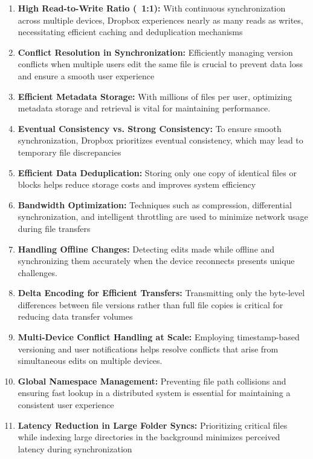 \begin{enumerate}
    \item \textbf{High Read-to-Write Ratio (~1:1):} With continuous synchronization across multiple devices, Dropbox experiences nearly as many reads as writes, necessitating efficient caching and deduplication mechanisms 
    \item \textbf{Conflict Resolution in Synchronization:} Efficiently managing version conflicts when multiple users edit the same file is crucial to prevent data loss and ensure a smooth user experience 
    \item \textbf{Efficient Metadata Storage:} With millions of files per user, optimizing metadata storage and retrieval is vital for maintaining performance.
    \item \textbf{Eventual Consistency vs. Strong Consistency:} To ensure smooth synchronization, Dropbox prioritizes eventual consistency, which may lead to temporary file discrepancies 
    \item \textbf{Efficient Data Deduplication:} Storing only one copy of identical files or blocks helps reduce storage costs and improves system efficiency 
    \item \textbf{Bandwidth Optimization:} Techniques such as compression, differential synchronization, and intelligent throttling are used to minimize network usage during file transfers 
    \item \textbf{Handling Offline Changes:} Detecting edits made while offline and synchronizing them accurately when the device reconnects presents unique challenges.
    \item \textbf{Delta Encoding for Efficient Transfers:} Transmitting only the byte-level differences between file versions rather than full file copies is critical for reducing data transfer volumes 
    \item \textbf{Multi-Device Conflict Handling at Scale:} Employing timestamp-based versioning and user notifications helps resolve conflicts that arise from simultaneous edits on multiple devices.
    \item \textbf{Global Namespace Management:} Preventing file path collisions and ensuring fast lookup in a distributed system is essential for maintaining a consistent user experience 
    \item \textbf{Latency Reduction in Large Folder Syncs:} Prioritizing critical files while indexing large directories in the background minimizes perceived latency during synchronization 
\end{enumerate}


